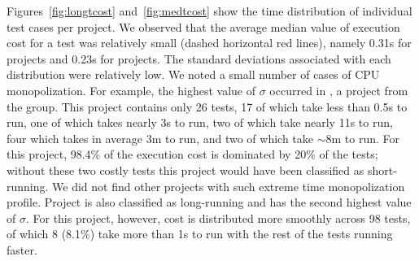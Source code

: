 \sloppy Figures~\ref{fig:longtcost} and~\ref{fig:medtcost} show the
time distribution of individual test cases per project.  We observed
that the average median value of execution cost for a test was
relatively small (dashed horizontal red lines), namely 0.31s for
\medg{} projects and 0.23s for \longg{} projects.  The standard
deviations associated with each distribution were relatively
low.  We noted a small number of
cases of CPU monopolization.  For example, the highest value of
$\sigma$ occurred in , a project from the
\longg{} group.  This project contains only 26 tests, 17 of which take
less than 0.5s to run, one of which takes nearly 3s to run, two of
which take nearly 11s to run, four which takes in average 3m to run, and two of
which take $\sim$8m to run.  For this project, 98.4\% of the
execution cost is dominated by 20\% of the tests; without these
two costly tests this project would have been classified as
short-running.
We did not find other projects with such extreme time monopolization
profile.
Project  is also classified as
long-running and has the second highest value of $\sigma$.
For this project, however, cost is distributed more smoothly across 98
tests, of which 8 (8.1\%) take more than 1s to run with the rest of
the tests running faster.

